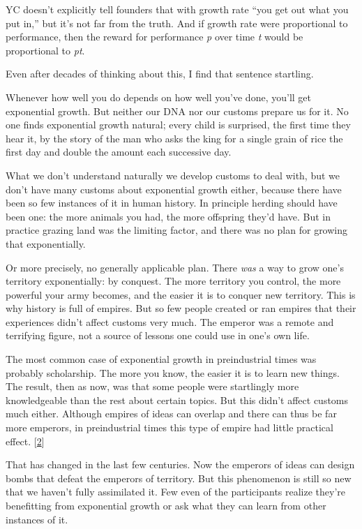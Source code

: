 YC doesn't explicitly tell founders that with growth rate ``you get out
what you put in,'' but it's not far from the truth. And if growth rate
were proportional to performance, then the reward for performance
\emph{p} over time \emph{t} would be proportional to \emph{pt}.

Even after decades of thinking about this, I find that sentence
startling.

Whenever how well you do depends on how well you've done, you'll get
exponential growth. But neither our DNA nor our customs prepare us for
it. No one finds exponential growth natural; every child is surprised,
the first time they hear it, by the story of the man who asks the king
for a single grain of rice the first day and double the amount each
successive day.

What we don't understand naturally we develop customs to deal with, but
we don't have many customs about exponential growth either, because
there have been so few instances of it in human history. In principle
herding should have been one: the more animals you had, the more
offspring they'd have. But in practice grazing land was the limiting
factor, and there was no plan for growing that exponentially.

Or more precisely, no generally applicable plan. There \emph{was} a way
to grow one's territory exponentially: by conquest. The more territory
you control, the more powerful your army becomes, and the easier it is
to conquer new territory. This is why history is full of empires. But so
few people created or ran empires that their experiences didn't affect
customs very much. The emperor was a remote and terrifying figure, not a
source of lessons one could use in one's own life.

The most common case of exponential growth in preindustrial times was
probably scholarship. The more you know, the easier it is to learn new
things. The result, then as now, was that some people were startlingly
more knowledgeable than the rest about certain topics. But this didn't
affect customs much either. Although empires of ideas can overlap and
there can thus be far more emperors, in preindustrial times this type of
empire had little practical effect. {[}\hyperref[f2n]{2}{]}

That has changed in the last few centuries. Now the emperors of ideas
can design bombs that defeat the emperors of territory. But this
phenomenon is still so new that we haven't fully assimilated it. Few
even of the participants realize they're benefitting from exponential
growth or ask what they can learn from other instances of it.

